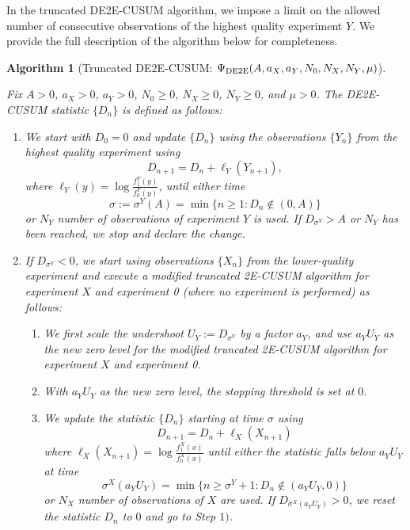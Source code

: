 \documentclass[journal, onecolumn]{IEEEtran}
\newtheorem{algorithm}{Algorithm}
\begin{document}
In the truncated DE2E-CUSUM algorithm, we impose a limit on the allowed number of consecutive observations of the highest quality experiment $Y$. We provide the full description of the algorithm below for completeness. 

\clearpage

\begin{algorithm}[Truncated DE2E-CUSUM: $\Psi_{\textup{DE2E}} (A, a_X, a_Y, N_0, N_X, N_Y, \mu)$]
\label{alg:trunc-de2e}

Fix $A > 0$, $a_X > 0$, $a_Y > 0$, $N_0 \geq 0$, $N_X \geq 0$, $N_Y \geq 0$, and $\mu > 0$. The \textup{DE2E-CUSUM} statistic $\{ D_n \}$ is defined as follows:

\begin{enumerate}
\item We start with $D_0 = 0$ and update $\{ D_n \}$ using the observations $\{ Y_n \}$ from the highest quality experiment using
$$ D_{n + 1}  = D_n + \ell_Y (Y_{n + 1}), $$
where $\ell_Y (y) = \log \frac{f_1^Y (y)}{f_0^Y (y)}$, until either time
$$ \sigma := \sigma^Y (A) = \min \{ n \geq 1: D_n \notin (0, A) \} $$
or $N_Y$ number of observations of experiment $Y$ is used. If $D_{\sigma^Y} > A$ or $N_Y$ has been reached, we stop and declare the change.

\item If $D_{\sigma^Y} < 0$, we start using observations $\{ X_n \}$ from the lower-quality experiment and execute a modified truncated \textup{2E-CUSUM} algorithm for experiment $X$ and experiment 0 (where no experiment is performed) as follows:

    \begin{enumerate}
    \item We first scale the undershoot $U_Y:= D_{\sigma^Y}$ by a factor $a_Y$, and use $a_Y U_Y$ as the new zero level for the modified truncated 2E-CUSUM algorithm for experiment $X$ and experiment 0.
    
    \item With $a_Y U_Y$ as the new zero level, the stopping threshold is set at $0$.
    
    \item We update the statistic $\{ D_n \}$ starting at time $\sigma$ using
    $$ D_{n + 1} = D_n + \ell_X (X_{n + 1}) $$
    where $\ell_X (X_{n + 1}) = \log \frac{f_1^X (x)}{f_0^X (x)}$ until either the statistic falls below $a_Y U_Y$ at time
    $$ \sigma^X (a_Y U_Y) = \min \{ n \geq \sigma^Y + 1: D_n \notin (a_Y U_Y, 0) \} $$
    or $N_X$ number of observations of $X$ are used. If $D_{\sigma^X (a_Y U_Y)} > 0$, we reset the statistic $D_n$ to $0$ and go to Step $1)$.
    

\end{enumerate}
\end{enumerate}
\end{algorithm}
\end{document}
